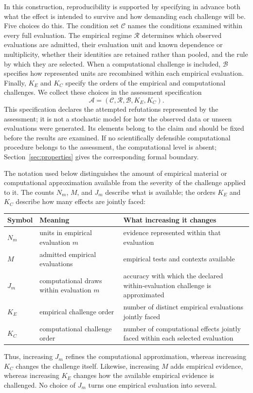 \documentclass[11pt]{article}
\newcommand{\Regime}{\mathcal{R}}
\newcommand{\Assess}{\mathcal{A}}
\newcommand{\CSet}{\mathcal{C}}
\newcommand{\Boot}{\mathcal{B}}
\theoremstyle{remark}
\begin{document}
In this construction, reproducibility is supported by specifying in advance
both what the effect is intended to survive and how demanding each challenge
will be. Five choices do this. The condition set $\CSet$ names the conditions
examined within every full evaluation. The empirical regime $\Regime$
determines which observed evaluations are admitted, their evaluation unit and
known dependence or multiplicity, whether their identities are retained rather
than pooled, and the rule by which they are selected. When a computational
challenge is included, $\Boot$ specifies how represented units are recombined
within each empirical evaluation. Finally, $K_E$ and $K_C$ specify the orders
of the empirical and computational challenges. We collect these choices in the
assessment specification
\[
\Assess
=
(\CSet,\Regime,\Boot,K_E,K_C).
\]
This specification declares the attempted refutations represented by the
assessment; it is not a stochastic model for how the observed data or unseen
evaluations were generated. Its elements belong to the claim and should be
fixed before the results are examined. If no scientifically defensible
computational procedure belongs to the assessment, the computational level is
absent; Section~\ref{sec:properties} gives the corresponding formal boundary.

The notation used below distinguishes the amount of empirical material or
computational approximation available from the severity of the challenge
applied to it. The counts $N_m$, $M$, and $J_m$ describe what is available; the
orders $K_E$ and $K_C$ describe how many effects are jointly faced:
\begin{center}
\begin{tabularx}{0.96\textwidth}{@{}l>{\raggedright\arraybackslash}X>{\raggedright\arraybackslash}X@{}}
\toprule
Symbol & Meaning & What increasing it changes \\
\midrule
$N_m$ & units in empirical evaluation $m$ & evidence represented within that evaluation \\
$M$ & admitted empirical evaluations & empirical tests and contexts available \\
$J_m$ & computational draws within evaluation $m$ & accuracy with which the declared within-evaluation challenge is approximated \\
$K_E$ & empirical challenge order & number of distinct empirical evaluations jointly faced \\
$K_C$ & computational challenge order & number of computational effects jointly faced within each selected evaluation \\
\bottomrule
\end{tabularx}
\end{center}
Thus, increasing $J_m$ refines the computational approximation, whereas
increasing $K_C$ changes the challenge itself. Likewise, increasing $M$ adds
empirical evidence, whereas increasing $K_E$ changes how the available
empirical evidence is challenged. No choice of $J_m$ turns one empirical
evaluation into several.
\end{document}
